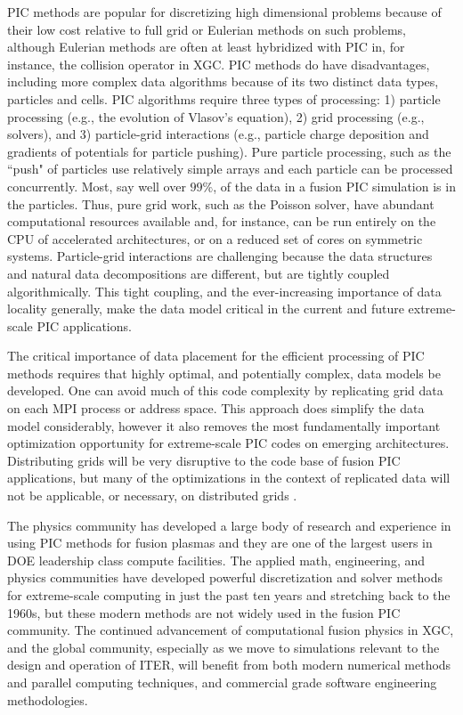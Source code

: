 \documentclass[review]{siamart}
\begin{document}
PIC methods are popular for discretizing high dimensional problems because of their low cost relative to full grid or Eulerian methods on such problems, although Eulerian methods are often at least hybridized with PIC in, for instance, the collision operator in XGC.
PIC methods do have disadvantages, including more complex data algorithms because of its two distinct data types, particles and cells.
PIC algorithms require three types of processing: 1) particle processing (e.g., the evolution of Vlasov's equation), 2) grid processing (e.g., solvers), and 3) particle-grid interactions (e.g., particle charge deposition and gradients of potentials for particle pushing).
Pure particle processing, such as the ``push" of particles use relatively simple arrays and each particle can be processed concurrently.
Most, say well over $99\%$, of the data in a fusion PIC simulation is in the particles.
Thus, pure grid work, such as the Poisson solver, have abundant computational resources available and, for instance, can be run entirely on the CPU of accelerated architectures, or on a reduced set of cores on symmetric systems.
Particle-grid interactions are challenging because the data structures and natural data decompositions are different, but are tightly coupled algorithmically.
This tight coupling, and the ever-increasing importance of data locality generally, make the data model critical in the current and future extreme-scale PIC applications.

The critical importance of data placement for the efficient processing of PIC methods requires that highly optimal, and potentially complex, data models be developed.
One can avoid much of this code complexity by replicating grid data on each MPI process or address space.
This approach does simplify the data model considerably, however it also removes the most fundamentally important optimization opportunity for extreme-scale PIC codes on emerging architectures.
Distributing grids will be very disruptive to the code base of fusion PIC applications, but many of the optimizations in the context of replicated data will not be applicable, or necessary, on distributed grids \cite{Adams-07a}.

The physics community has developed a large body of research and experience in using PIC methods for fusion plasmas and they are one of the largest users in DOE leadership class compute facilities.
The applied math, engineering, and physics communities have developed powerful discretization and solver methods for extreme-scale computing in just the past ten years and stretching back to the 1960s, but these modern methods are not widely used in the fusion PIC community.
The continued advancement of computational fusion physics in XGC, and the global community, especially as we move to simulations relevant to the design and operation of ITER, will benefit from both modern numerical methods and parallel computing techniques, and commercial grade software engineering methodologies.
\end{document}
